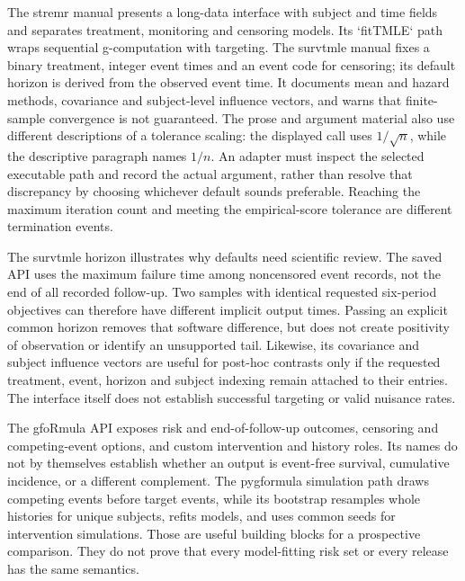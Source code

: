 The stremr manual presents a long-data interface with subject and time fields
and separates treatment, monitoring and censoring models. Its `fitTMLE` path
wraps sequential g-computation with targeting. The survtmle manual fixes a
binary treatment, integer event times and an event code for censoring; its
default horizon is derived from the observed event time. It documents mean and
hazard methods, covariance and subject-level influence vectors, and warns that
finite-sample convergence is not guaranteed. The prose and argument material
also use different descriptions of a tolerance scaling: the displayed call
uses $1/\sqrt n$, while the descriptive paragraph names $1/n$.
An adapter must inspect the selected executable path and record the actual
argument, rather than resolve that discrepancy by choosing whichever
default sounds preferable. Reaching the maximum iteration count and meeting
the empirical-score tolerance are different termination events.
\citep{v12_sw_stremr,v12_sw_survtmle}

The survtmle horizon illustrates why defaults need scientific review.
The saved API uses the maximum failure time among noncensored event records,
not the end of all recorded follow-up. Two samples with identical requested
six-period objectives can therefore have different implicit output times.
Passing an explicit common horizon removes that software difference, but
does not create positivity of observation or identify an unsupported tail.
Likewise, its covariance and subject influence vectors are useful for
post-hoc contrasts only if the requested treatment, event, horizon and
subject indexing remain attached to their entries. The interface itself
does not establish successful targeting or valid nuisance rates.

The gfoRmula API exposes risk and end-of-follow-up outcomes, censoring and
competing-event options, and custom intervention and history roles. Its names
do not by themselves establish whether an output is event-free survival,
cumulative incidence, or a different complement. The pygformula simulation
path draws competing events before target events, while its bootstrap resamples
whole histories for unique subjects, refits models, and uses common seeds for
intervention simulations. Those are useful building blocks for a prospective
comparison. They do not prove that every model-fitting risk set or every
release has the same semantics.~\citep{sw_gformula,v13_sw_pygformula,v131_sw_pygformula}

